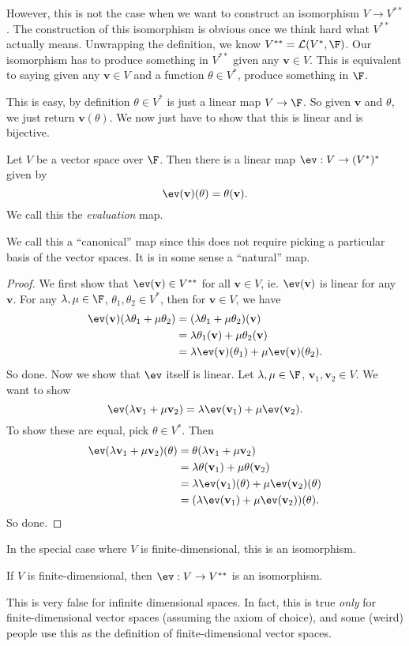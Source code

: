 \documentclass[a4paper]{article}
\begin{document}
However, this is not the case when we want to construct an isomorphism $V \to V^{**}$. The construction of this isomorphism is obvious once we think hard what $V^{**}$ actually means. Unwrapping the definition, we know $V^{**} = \mathcal{L}(V^*, \F)$. Our isomorphism has to produce something in $V^{**}$ given any $\mathbf{v} \in V$. This is equivalent to saying given any $\mathbf{v} \in V$ and a function $\theta \in V^*$, produce something in $\F$.

This is easy, by definition $\theta \in V^*$ is just a linear map $V \to \F$. So given $\mathbf{v}$ and $\theta$, we just return $\mathbf{v}(\theta)$. We now just have to show that this is linear and is bijective.
\begin{lemma}
  Let $V$ be a vector space over $\F$. Then there is a linear map $\ev: V\to (V^*)^*$ given by
  \[
    \ev (\mathbf{v})(\theta) = \theta(\mathbf{v}).
  \]
  We call this the \emph{evaluation} map.
\end{lemma}
We call this a ``canonical'' map since this does not require picking a particular basis of the vector spaces. It is in some sense a ``natural'' map.

\begin{proof}
  We first show that $\ev(\mathbf{v}) \in V^{**}$ for all $\mathbf{v}\in V$, ie. $\ev (\mathbf{v})$ is linear for any $\mathbf{v}$. For any $\lambda, \mu\in \F$, $\theta_1, \theta_2 \in V^*$, then for $\mathbf{v} \in V$, we have
  \begin{align*}
    \ev(\mathbf{v})(\lambda\theta_1 + \mu\theta_2) &= (\lambda\theta_1 + \mu\theta_2)(\mathbf{v}) \\
    &= \lambda\theta_1(\mathbf{v}) + \mu\theta_2(\mathbf{v}) \\
    &= \lambda\ev(\mathbf{v})(\theta_1) + \mu \ev(\mathbf{v})(\theta_2).
  \end{align*}
  So done. Now we show that $\ev$ itself is linear. Let $\lambda, \mu\in \F$, $\mathbf{v}_1, \mathbf{v}_2 \in V$. We want to show
  \[
    \ev(\lambda\mathbf{v}_1 + \mu \mathbf{v}_2) = \lambda \ev (\mathbf{v}_1) + \mu \ev(\mathbf{v}_2).
  \]
  To show these are equal, pick $\theta \in V^*$. Then
  \begin{align*}
    \ev(\lambda \mathbf{v}_1 + \mu \mathbf{v}_2)(\theta) &= \theta(\lambda\mathbf{v}_1 + \mu \mathbf{v}_2) \\
    &= \lambda\theta(\mathbf{v}_1) + \mu \theta(\mathbf{v}_2) \\
    &= \lambda \ev(\mathbf{v}_1)(\theta) + \mu \ev(\mathbf{v}_2)(\theta) \\
    &= (\lambda \ev(\mathbf{v}_1) + \mu \ev(\mathbf{v}_2))(\theta).
  \end{align*}
  So done.
\end{proof}
In the special case where $V$ is finite-dimensional, this is an isomorphism.
\begin{lemma}
  If $V$ is finite-dimensional, then $\ev: V \to V^{**}$ is an isomorphism.
\end{lemma}
This is very false for infinite dimensional spaces. In fact, this is true \emph{only} for finite-dimensional vector spaces (assuming the axiom of choice), and some (weird) people use this as the definition of finite-dimensional vector spaces.
\end{document}
